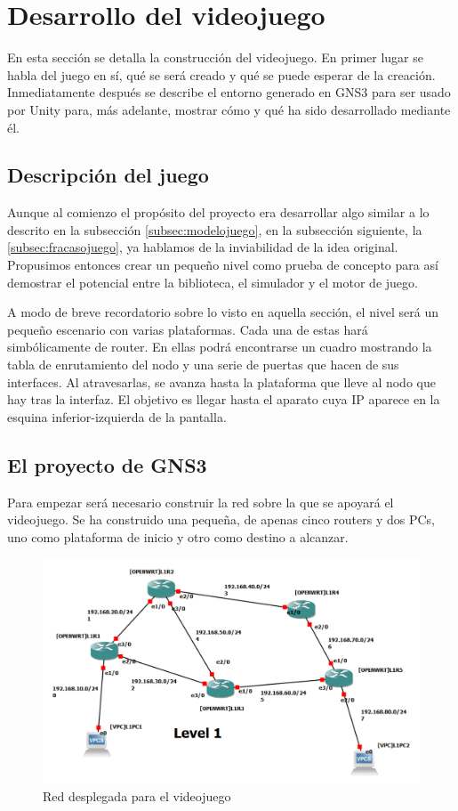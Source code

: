 \section{Desarrollo del videojuego}
En esta sección se detalla la construcción del videojuego. En primer lugar se habla del juego en sí, qué se será creado y qué se puede esperar de la creación. Inmediatamente después se describe el entorno generado en GNS3 para ser usado por Unity para, más adelante, mostrar cómo y qué ha sido desarrollado mediante él.

\subsection{Descripción del juego}
Aunque al comienzo el propósito del proyecto era desarrollar algo similar a lo descrito en la subsección \ref{subsec:modelojuego}, en la subsección siguiente, la \ref{subsec:fracasojuego}, ya hablamos de la inviabilidad de la idea original. Propusimos entonces crear un pequeño nivel como prueba de concepto para así demostrar el potencial entre la biblioteca, el simulador y el motor de juego.

A modo de breve recordatorio sobre lo visto en aquella sección, el nivel será un pequeño escenario con varias plataformas. Cada una de estas hará simbólicamente de router. En ellas podrá encontrarse un cuadro mostrando la tabla de enrutamiento del nodo y una serie de puertas que hacen de sus interfaces. Al atravesarlas, se avanza hasta la plataforma que lleve al nodo que hay tras la interfaz. El objetivo es llegar hasta el aparato cuya IP aparece en la esquina inferior-izquierda de la pantalla.

\subsection{El proyecto de GNS3}
Para empezar será necesario construir la red sobre la que se apoyará el videojuego. Se ha construido una pequeña, de apenas cinco routers y dos PCs, uno como plataforma de inicio y otro como destino a alcanzar.

\begin{figure}[h]
  \centering
  \includegraphics[scale=0.225]{imagenes/redGNS3}
  \caption{Red desplegada para el videojuego}
  \label{fig:esquematico_red}
\end{figure}

